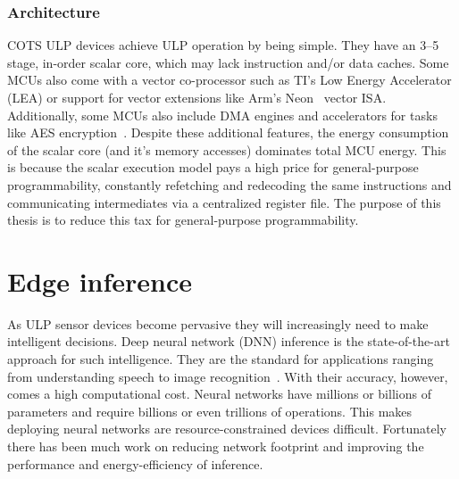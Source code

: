 \subsubsection{Architecture}
COTS ULP devices achieve ULP operation by being simple.
% 
They have an 3--5 stage, in-order scalar core, which may lack instruction and/or data caches.
% 
Some MCUs also come with a vector co-processor such as TI's Low Energy Accelerator (LEA) or support for vector extensions like Arm's Neon~\cite{neon} vector ISA.
% 
Additionally, some MCUs also include DMA engines and accelerators for tasks like AES encryption~\cite{msp430fr5994}.
% 
Despite these additional features, the energy consumption of the scalar core (and it's memory accesses) dominates total MCU energy.
% 
This is because the scalar execution model pays a high price for general-purpose programmability, constantly refetching and redecoding the same instructions and communicating intermediates via a centralized register file.
% 
The purpose of this thesis is to reduce this tax for general-purpose programmability.

\section{Edge inference}
As ULP sensor devices become pervasive they will increasingly need to make intelligent decisions.
% 
Deep neural network (DNN) inference is the state-of-the-art approach for such intelligence.
% 
They are the standard for applications ranging from understanding speech to image recognition~\cite{alexnet,vgg, googlenet}.
% 
With their accuracy, however, comes a high computational cost.
% 
Neural networks have millions or billions of parameters and require billions or even trillions of operations.
% 
This makes deploying neural networks are resource-constrained devices difficult.
% 
Fortunately there has been much work on reducing network footprint and improving the performance and energy-efficiency of inference.
% 

